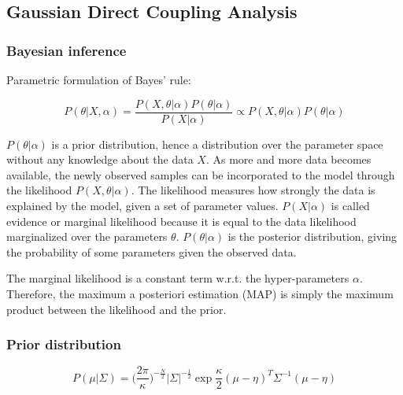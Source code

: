     \subsection{Gaussian Direct Coupling Analysis}

        \subsubsection{Bayesian inference}

            Parametric formulation of Bayes' rule:
            
            \begin{equation}
                P(\theta \vert X, \alpha) = \frac{P(X, \theta \vert \alpha) P(\theta \vert \alpha)}{P(X \vert \alpha)} \propto 
                P(X, \theta \vert \alpha) P(\theta \vert \alpha)
            \end{equation}

            $P(\theta \vert \alpha)$ is a prior distribution, hence a distribution over the parameter space without
            any knowledge about the data $X$. As more and more data becomes available, the newly observed samples can be
            incorporated to the model through the likelihood $P(X, \theta \vert \alpha)$. The likelihood measures how strongly
            the data is explained by the model, given a set of parameter values. $P(X \vert \alpha)$ is called evidence or
            marginal likelihood because it is equal to the data likelihood marginalized over the parameters $\theta$.
            $P(\theta \vert \alpha)$ is the posterior distribution, giving the probability of some parameters given
            the observed data. 

            The marginal likelihood is a constant term w.r.t. the hyper-parameters $\alpha$. Therefore, the maximum
            a posteriori estimation (MAP) is simply the maximum product between the likelihood and the prior.

        \subsubsection{Prior distribution}

            \begin{equation}
                P(\mu \vert \Sigma) = \Big(\frac{2 \pi}{\kappa}\Big)^{-\frac{N}{2}} \vert\Sigma\vert^{-\frac{1}{2}} \exp{\frac{\kappa}{2}
                (\mu - \eta)^T \Sigma^{-1} (\mu - \eta)}
            \end{equation}


